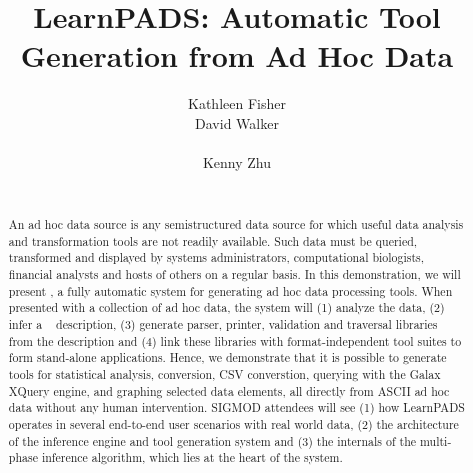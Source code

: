 \documentclass[preprint]{sig-alternate-sigmod08}
\title{LearnPADS: Automatic Tool Generation from Ad Hoc Data}
\author{\alignauthor Kathleen Fisher \\
\affaddr{AT\&T Labs Research}
\email{kfisher@research.att.com}
\alignauthor David Walker \\
\affaddr{Princeton University}\\
\email{dpw@cs.princeton.edu}
\alignauthor Kenny Zhu \\
\affaddr{Princeton University}\\
\email{kzhu@cs.princeton.edu}
}
\begin{document}
\maketitle
\begin{abstract}
An ad hoc data source is any semistructured data source for which
useful data analysis and transformation tools are not readily available.
Such data must be queried, transformed and displayed by
systems administrators, computational biologists, financial analysts
and hosts of others on a regular basis.
In this demonstration, we will present \learnpads, 
a fully automatic system for generating
ad hoc data processing tools.  When presented with a collection of
ad hoc data, the system will (1) analyze the data, (2) infer a 
\pads{}~\cite{fisher+:pads,fisher+:popl06} description, (3) 
generate parser, printer, validation and traversal libraries from the
description and (4) link these libraries with format-independent 
tool suites to form stand-alone applications.  Hence, we demonstrate that 
it is possible to generate tools for statistical analysis, \xml{}
conversion, CSV converstion, querying with the 
Galax XQuery engine, and graphing selected data elements, all
directly from ASCII ad hoc data without any human intervention.
SIGMOD attendees will see (1) how LearnPADS operates in 
several end-to-end user scenarios with
real world data, (2) the architecture of the inference engine and
tool generation system and (3) the internals of the multi-phase 
inference algorithm, which lies at the heart of the system.


\end{abstract}
\end{document}
